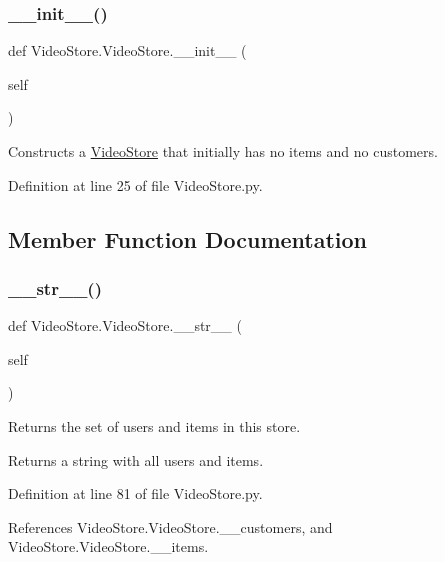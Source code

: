 \subsubsection{\texorpdfstring{\+\_\+\+\_\+init\+\_\+\+\_\+()}{\_\_init\_\_()}}
{\footnotesize\ttfamily def Video\+Store.\+Video\+Store.\+\_\+\+\_\+init\+\_\+\+\_\+ (\begin{DoxyParamCaption}\item[{}]{self }\end{DoxyParamCaption})}



Constructs a \hyperlink{classVideoStore_1_1VideoStore}{Video\+Store} that initially has no items and no customers. 



Definition at line 25 of file Video\+Store.\+py.



\subsection{Member Function Documentation}
\mbox{\label{classVideoStore_1_1VideoStore_a3c4bdb8e1df76ed65d00fdb32da18a3c}} 
\subsubsection{\texorpdfstring{\+\_\+\+\_\+str\+\_\+\+\_\+()}{\_\_str\_\_()}}
{\footnotesize\ttfamily def Video\+Store.\+Video\+Store.\+\_\+\+\_\+str\+\_\+\+\_\+ (\begin{DoxyParamCaption}\item[{}]{self }\end{DoxyParamCaption})}



Returns the set of users and items in this store. 

\begin{DoxyReturn}{Returns}
a string with all users and items. 
\end{DoxyReturn}


Definition at line 81 of file Video\+Store.\+py.



References Video\+Store.\+Video\+Store.\+\_\+\+\_\+customers, and Video\+Store.\+Video\+Store.\+\_\+\+\_\+items.

